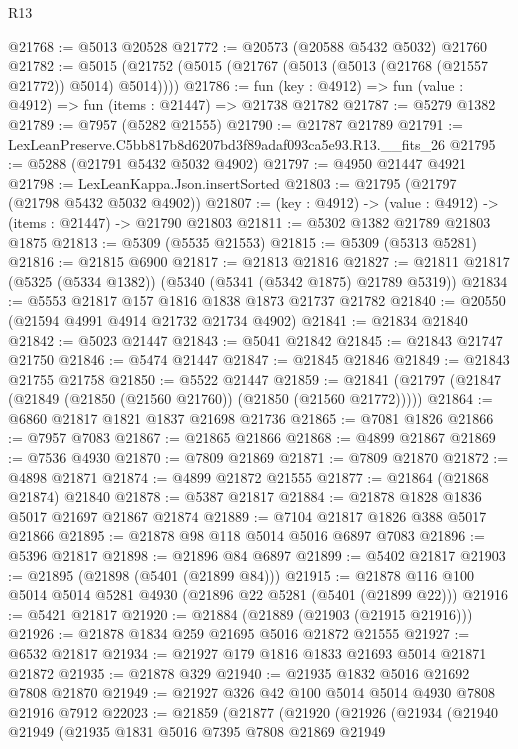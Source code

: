\begin{lexlean}{R13}
\begin{coremodule}
@21768 := @5013 @20528
@21772 := @20573 (@20588 @5432 @5032) @21760
@21782 := @5015 (@21752 (@5015 (@21767 (@5013 (@5013 (@21768 (@21557 @21772)) @5014) @5014))))
@21786 := fun (key : @4912) => fun (value : @4912) => fun (items : @21447) => @21738 @21782
@21787 := @5279 @1382
@21789 := @7957 (@5282 @21555)
@21790 := @21787 @21789
@21791 := LexLeanPreserve.C5bb817b8d6207bd3f89adaf093ca5e93.R13.__fits_26
@21795 := @5288 (@21791 @5432 @5032 @4902)
@21797 := @4950 @21447 @4921
@21798 := LexLeanKappa.Json.insertSorted
@21803 := @21795 (@21797 (@21798 @5432 @5032 @4902))
@21807 := (key : @4912) -> (value : @4912) -> (items : @21447) -> @21790 @21803
@21811 := @5302 @1382 @21789 @21803 @1875
@21813 := @5309 (@5535 @21553)
@21815 := @5309 (@5313 @5281)
@21816 := @21815 @6900
@21817 := @21813 @21816
@21827 := @21811 @21817 (@5325 (@5334 @1382)) (@5340 (@5341 (@5342 @1875) @21789 @5319))
@21834 := @5553 @21817 @157 @1816 @1838 @1873 @21737 @21782
@21840 := @20550 (@21594 @4991 @4914 @21732 @21734 @4902)
@21841 := @21834 @21840
@21842 := @5023 @21447
@21843 := @5041 @21842
@21845 := @21843 @21747 @21750
@21846 := @5474 @21447
@21847 := @21845 @21846
@21849 := @21843 @21755 @21758
@21850 := @5522 @21447
@21859 := @21841 (@21797 (@21847 (@21849 (@21850 (@21560 @21760)) (@21850 (@21560 @21772)))))
@21864 := @6860 @21817 @1821 @1837 @21698 @21736
@21865 := @7081 @1826
@21866 := @7957 @7083
@21867 := @21865 @21866
@21868 := @4899 @21867
@21869 := @7536 @4930
@21870 := @7809 @21869
@21871 := @7809 @21870
@21872 := @4898 @21871
@21874 := @4899 @21872 @21555
@21877 := @21864 (@21868 @21874) @21840
@21878 := @5387 @21817
@21884 := @21878 @1828 @1836 @5017 @21697 @21867 @21874
@21889 := @7104 @21817 @1826 @388 @5017 @21866
@21895 := @21878 @98 @118 @5014 @5016 @6897 @7083
@21896 := @5396 @21817
@21898 := @21896 @84 @6897
@21899 := @5402 @21817
@21903 := @21895 (@21898 (@5401 (@21899 @84)))
@21915 := @21878 @116 @100 @5014 @5014 @5281 @4930 (@21896 @22 @5281 (@5401 (@21899 @22)))
@21916 := @5421 @21817
@21920 := @21884 (@21889 (@21903 (@21915 @21916)))
@21926 := @21878 @1834 @259 @21695 @5016 @21872 @21555
@21927 := @6532 @21817
@21934 := @21927 @179 @1816 @1833 @21693 @5014 @21871 @21872
@21935 := @21878 @329
@21940 := @21935 @1832 @5016 @21692 @7808 @21870
@21949 := @21927 @326 @42 @100 @5014 @5014 @4930 @7808 @21916 @7912
@22023 := @21859
    (@21877
      (@21920
        (@21926
          (@21934
            (@21940
              @21949
              (@21935
                @1831
                @5016
                @7395
                @7808
                @21869
                @21949

\end{coremodule}
\end{lexlean}
